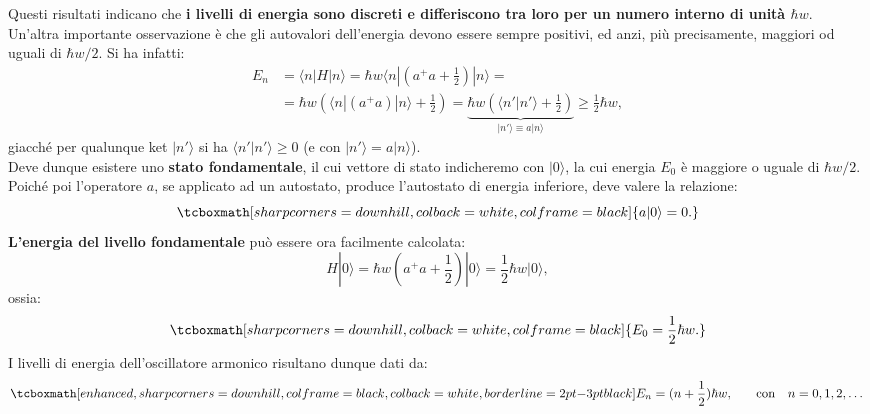  Questi risultati indicano che \textbf{i livelli di energia sono discreti e differiscono tra loro per un numero interno di unità $\hbar w$}.\\
 
 Un'altra importante osservazione è che gli autovalori dell'energia devono essere sempre positivi, ed anzi, più precisamente, maggiori od uguali di $\hbar w/2$. Si ha infatti:
\begin{align}
	E_n&=\langle n|H|n \rangle= \hbar w \langle n|(a^+a+\frac{1}{2})|n\rangle= \nonumber \\
	&=\hbar w (\langle n|(a^+a)|n\rangle+\frac{1}{2})=\underbrace{\hbar w (\langle n'|n'\rangle+\frac{1}{2})}_{\vert n' \rangle \equiv a \vert n \rangle} \geq \frac{1}{2} \hbar w, 
\end{align}
giacché per qualunque ket $|n'\rangle$ si ha $\langle n'|n' \rangle\geq 0$ (e con $|n'\rangle= a|n\rangle$).\\

Deve dunque esistere uno \textbf{stato fondamentale}, il cui vettore di stato indicheremo con $|0\rangle$, la cui energia $E_0$ è maggiore o uguale di $\hbar w/2$. Poiché poi l'operatore $a$, se applicato ad un autostato, produce l'autostato di energia inferiore, deve valere la relazione:
	\begin{equation}  \label{eq:cap11_7}
		\tcboxmath[sharp corners=downhill, colback=white, colframe=black]{
			a|0\rangle=0.
			}
	\end{equation}
 \textbf{L'energia del livello fondamentale} può essere ora facilmente calcolata:
	\begin{equation}
		H|0\rangle= \hbar w(a^+a+\frac{1}{2})|0\rangle= \frac{1}{2} \hbar w |0\rangle,
	\end{equation}
ossia:
	\begin{equation}
		\tcboxmath[sharp corners=downhill, colback=white, colframe=black]{
			E_0=\frac{1}{2} \hbar w .
			}
	\end{equation}
 I livelli di energia dell'oscillatore armonico risultano dunque dati da:
	\begin{equation}
  		\label{eq:cap11_8}
		\tcboxmath[enhanced, sharp corners=downhill, colframe=black, colback=white, borderline={2pt}{-3pt}{black}]{
			E_n=(n+\frac{1}{2}) \hbar w ,
			} \qquad
			\textrm{con}\quad n=0,1,2,\dots 
\end{equation}\\

